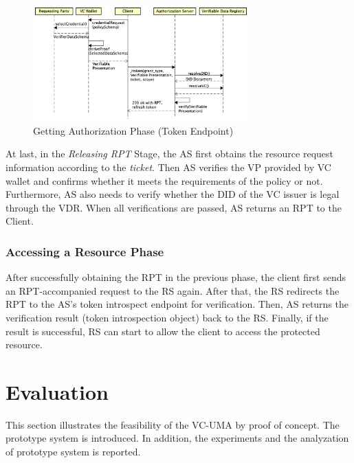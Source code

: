 \documentclass[conference, dvipdfmx]{IEEEtran} %
\begin{document}
\begin{sloppypar}
\begin{figure}[htbp] %
  \begin{center} %
  \includegraphics[width=83mm]{images/GetAuthorization_Token_Endpoint.png} %
  \caption{Getting Authorization Phase (Token Endpoint)} %
  \label{fig:GetAuthorization_Token_Endpoint} %
  \end{center}
\end{figure}

At last, in the \textit{Releasing RPT} Stage, the AS first obtains the resource request information according to the \textit{ticket}. Then AS verifies the VP provided by VC wallet and confirms whether it meets the requirements of the policy or not. Furthermore, AS also needs to verify whether the DID of the VC issuer is legal through the VDR. When all verifications are passed, AS returns an RPT to the Client.

\subsubsection{Accessing a Resource Phase}
After successfully obtaining the RPT in the previous phase, the client first sends an RPT-accompanied request to the RS again. After that, the RS redirects the RPT to the AS's token introspect endpoint for verification. 
Then, AS returns the verification result (token introspection object) back to the RS. Finally, if the result is successful, RS can start to allow the client to access the protected resource.

\section{Evaluation}
\label{sec:Evaluation}

This section illustrates the feasibility of the VC-UMA by proof of concept. The prototype system is introduced. In addition, the experiments and the analyzation of prototype system is reported.


\end{sloppypar}
\end{document}
